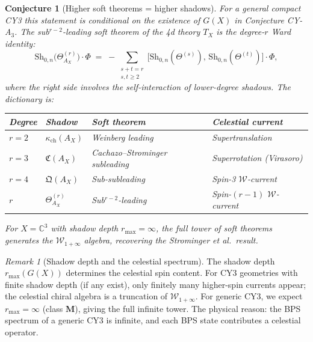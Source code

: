 \documentclass[11pt]{article}
\newtheorem{conjecture}[theorem]{Conjecture}
\theoremstyle{definition}
\theoremstyle{remark}
\newtheorem{remark}[theorem]{Remark}
\newcommand{\cW}{\mathcal{W}}
\newcommand{\Sh}{\mathrm{Sh}}
\begin{document}
\begin{conjecture}[Higher soft theorems = higher shadows]
\label{conj:higher-soft-shadows}
For a general compact CY3 this statement is conditional on the
existence of $G(X)$ in Conjecture CY-A$_3$.
The sub$^{r-2}$-leading soft theorem of the 4d theory $T_X$ is the
degree-$r$ Ward identity:
\begin{equation}\label{eq:higher-soft-shadow}
\Sh_{0,n}\bigl(\Theta_{A_X}^{(r)}\bigr) \cdot \Phi
\;=\;
-\sum_{\substack{s+t=r \\ s,t \geq 2}}
\bigl[\Sh_{0,n}(\Theta^{(s)}),\,
\Sh_{0,n}(\Theta^{(t)})\bigr] \cdot \Phi,
\end{equation}
where the right side involves the self-interaction of lower-degree
shadows. The dictionary is:
\begin{center}
\small
\renewcommand{\arraystretch}{1.3}
\begin{tabular}{llll}
\toprule
\textit{Degree} & \textit{Shadow} &
\textit{Soft theorem} & \textit{Celestial current} \\
\midrule
$r=2$ & $\kappa_{\mathrm{ch}}(A_X)$ &
Weinberg leading & Supertranslation \\
$r=3$ & $\mathfrak{C}(A_X)$ &
Cachazo--Strominger subleading &
Superrotation (Virasoro) \\
$r=4$ & $\mathfrak{Q}(A_X)$ &
Sub-subleading &
Spin-3 $\cW$-current \\
$r$ & $\Theta_{A_X}^{(r)}$ &
Sub$^{r-2}$-leading &
Spin-$(r-1)$ $\cW$-current \\
\bottomrule
\end{tabular}
\end{center}
For $X = \mathbb{C}^3$ with shadow depth $r_{\max} = \infty$, the
full tower of soft theorems generates the $\cW_{1+\infty}$ algebra,
recovering the Strominger et al.\ result.
\end{conjecture}

\begin{remark}[Shadow depth and the celestial spectrum]
\label{rem:shadow-depth-celestial}
The shadow depth $r_{\max}(G(X))$ determines the celestial spin
content. For CY3 geometries with finite shadow depth (if any
exist), only finitely many higher-spin currents appear; the
celestial chiral algebra is a truncation of $\cW_{1+\infty}$.
For generic CY3, we expect $r_{\max} = \infty$ (class
$\mathbf{M}$), giving the full infinite tower. The physical
reason: the BPS spectrum of a generic CY3 is infinite, and each
BPS state contributes a celestial operator.
\end{remark}
\end{document}
